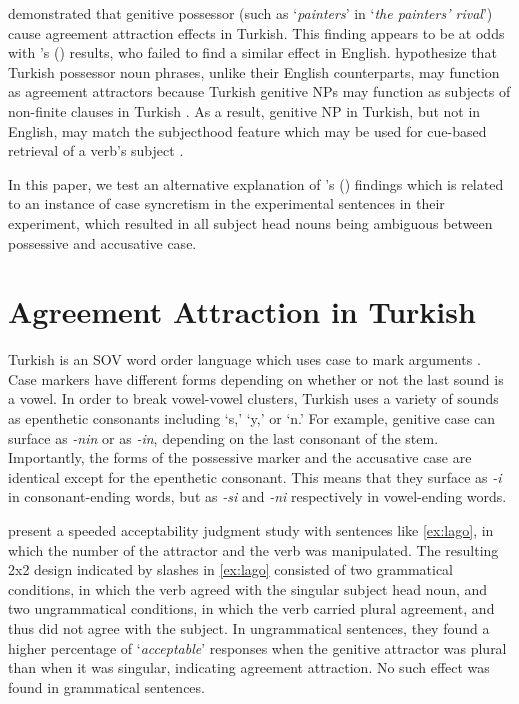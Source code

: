 \documentclass[times,linguex]{glossa}\usepackage[]{graphicx}\usepackage[]{color}
\begin{document}
\citet{LagoEtAl:2018} demonstrated that genitive possessor (such as `\textit{painters}' in `\textit{the painters' rival}') cause agreement attraction effects in Turkish. This finding appears to be at odds with \citeauthor{NicolEtAl:2016}'s (\citeyear{NicolEtAl:2016}) results, who failed to find a similar effect in English. \citet{LagoEtAl:2018} hypothesize that Turkish possessor noun phrases, unlike their English counterparts, may function as agreement attractors because Turkish genitive NPs may function as subjects of non-finite clauses in Turkish \citep{GokselKerslake:2005}. As a result, genitive NP in Turkish, but not in English, may match the subjecthood feature which may be used for cue-based retrieval of a verb's subject \citep{LewisVasishth:2005, ArnettWagers:2017}.

In this paper, we test an alternative explanation of \citeauthor{LagoEtAl:2018}'s (\citeyear{LagoEtAl:2018}) findings which is related to an instance of case syncretism in the experimental sentences in their experiment, which resulted in all subject head nouns being ambiguous between possessive and accusative case.


\section{Agreement Attraction in Turkish}

Turkish is an SOV word order language which uses case to mark arguments \citep{GokselKerslake:2005}. Case markers have different forms depending on whether or not the last sound is a vowel. In order to break vowel-vowel clusters, Turkish uses a variety of sounds as epenthetic consonants including `s,' `y,' or `n.'  For example, genitive case can surface as \textit{-nin} or as \textit{-in}, depending on the last consonant of the stem. Importantly, the forms of the possessive marker and the accusative case are identical except for the epenthetic consonant. This means that they surface as \textit{-i} in consonant-ending words, but as \textit{-si} and \textit{-ni} respectively in vowel-ending words. 


\citet{LagoEtAl:2018} present a speeded acceptability judgment study with sentences like \ref{ex:lago}, in which the number of the attractor and the verb was manipulated. The resulting 2x2 design indicated by slashes in \ref{ex:lago} consisted of two grammatical conditions, in which the verb agreed with the singular subject head noun, and two ungrammatical conditions, in which the verb carried plural agreement, and thus did not agree with the subject. In ungrammatical sentences, they found a higher percentage of `\textit{acceptable}' responses when the genitive attractor was plural than when it was singular, indicating agreement attraction. No such effect was found in grammatical sentences.
\end{document}
